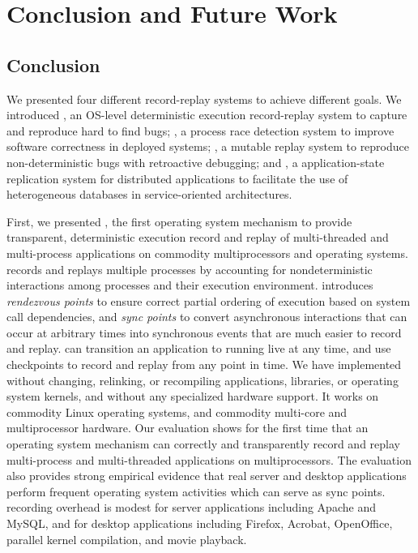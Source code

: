 \chapter{Conclusion and Future Work}
\label{ch:conclusion}

\section{Conclusion}

We presented four different record-replay systems to achieve different goals.
We introduced \scribe, an OS-level deterministic execution record-replay system
to capture and reproduce hard to find bugs; \racepro, a process race detection
system to improve software correctness in deployed systems; \dora, a mutable
replay system to reproduce non-deterministic bugs with retroactive debugging;
and \synapse, a application-state replication system for distributed
applications to facilitate the use of heterogeneous databases in
service-oriented architectures.

First, we presented \scribe{}, the first operating system mechanism to provide
transparent, deterministic execution record and replay of multi-threaded and
multi-process applications on commodity multiprocessors and operating systems.
\scribe{} records and replays multiple processes by accounting for
nondeterministic interactions among processes and their execution environment.
\scribe{} introduces {\em rendezvous points} to ensure correct partial ordering
of execution based on system call dependencies, and {\em sync points} to convert
asynchronous interactions that can occur at arbitrary times into synchronous
events that are much easier to record and replay.  \scribe{} can transition an
application  to running live at any time, and use checkpoints to record and
replay from any point in time.
We have implemented \scribe{} without changing, relinking, or
recompiling applications, libraries, or operating system kernels, and
without any specialized hardware support. It works on commodity Linux
operating systems, and commodity multi-core and multiprocessor
hardware.  Our evaluation shows for the first time that an operating
system mechanism can correctly and transparently record and replay
multi-process and multi-threaded applications on multiprocessors.  The
evaluation also provides strong empirical evidence that 
real server and desktop applications perform frequent
operating system activities which can serve as sync points.
\scribe{} recording overhead is modest for server applications including Apache
and MySQL, and for desktop applications including Firefox, Acrobat, OpenOffice,
parallel kernel compilation, and movie playback.

